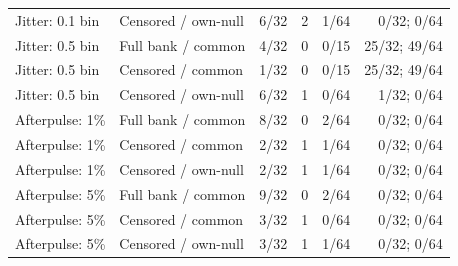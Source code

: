 \begin{table}[t]
\begin{tabular}{llrrrr}
Jitter: 0.1 bin & Censored / own-null & 6/32 & 2 & 1/64 & 0/32; 0/64\\
Jitter: 0.5 bin & Full bank / common & 4/32 & 0 & 0/15 & 25/32; 49/64\\
Jitter: 0.5 bin & Censored / common & 1/32 & 0 & 0/15 & 25/32; 49/64\\
Jitter: 0.5 bin & Censored / own-null & 6/32 & 1 & 0/64 & 1/32; 0/64\\
Afterpulse: 1\% & Full bank / common & 8/32 & 0 & 2/64 & 0/32; 0/64\\
Afterpulse: 1\% & Censored / common & 2/32 & 1 & 1/64 & 0/32; 0/64\\
Afterpulse: 1\% & Censored / own-null & 2/32 & 1 & 1/64 & 0/32; 0/64\\
Afterpulse: 5\% & Full bank / common & 9/32 & 0 & 2/64 & 0/32; 0/64\\
Afterpulse: 5\% & Censored / common & 3/32 & 1 & 0/64 & 0/32; 0/64\\
Afterpulse: 5\% & Censored / own-null & 3/32 & 1 & 1/64 & 0/32; 0/64\\
\bottomrule\end{tabular}\end{table}
